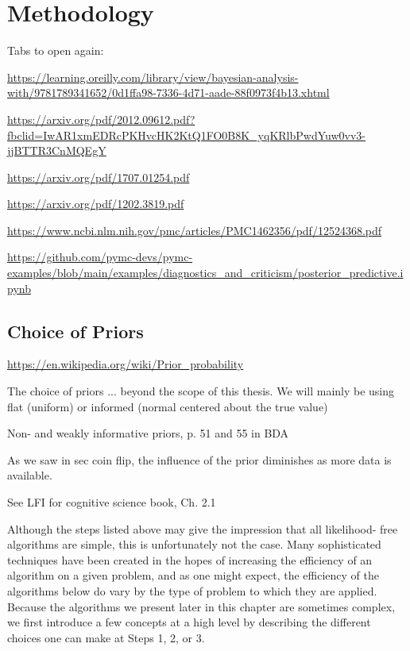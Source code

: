 \chapter{Methodology}\label{chap:methodology}

Tabs to open again:

\url{https://learning.oreilly.com/library/view/bayesian-analysis-with/9781789341652/0d1ffa98-7336-4d71-aade-88f0973f4b13.xhtml}

\url{https://arxiv.org/pdf/2012.09612.pdf?fbclid=IwAR1xmEDRcPKHvcHK2KtQ1FO0B8K_yqKRlbPwdYuw0vv3-jjBTTR3CnMQEgY}

\url{https://arxiv.org/pdf/1707.01254.pdf}

\url{https://arxiv.org/pdf/1202.3819.pdf}

\url{https://www.ncbi.nlm.nih.gov/pmc/articles/PMC1462356/pdf/12524368.pdf}

\url{https://github.com/pymc-devs/pymc-examples/blob/main/examples/diagnostics_and_criticism/posterior_predictive.ipynb}

\section{Choice of Priors}

\url{https://en.wikipedia.org/wiki/Prior_probability}


The choice of priors ... beyond the scope of this thesis. We will mainly be using flat (uniform) or informed (normal centered about the true value)

Non- and weakly informative priors, p. 51 and 55 in BDA

As we saw in sec coin flip, the influence of the prior diminishes as more data is available.  


See LFI for cognitive science book, Ch. 2.1

Although the steps listed above may give the impression that all likelihood- free algorithms are simple, this is unfortunately not the case. Many sophisticated techniques have been created in the hopes of increasing the efficiency of an algorithm on a given problem, and as one might expect, the efficiency of the algorithms below do vary by the type of problem to which they are applied. Because the algorithms we present later in this chapter are sometimes complex, we first introduce a few concepts at a high level by describing the different choices one can make at Steps 1, 2, or 3.


